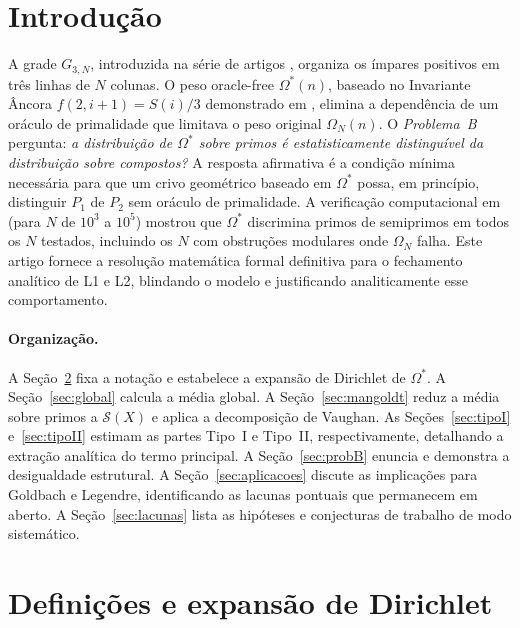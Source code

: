 \documentclass[12pt]{article}
\theoremstyle{definition}
\theoremstyle{remark}
\newcommand{\Omstar}{\Omega^*}
\newcommand{\Sc}{\mathcal{S}}
\begin{document}
	\tableofcontents
	\newpage
	
	\section{Introdução}
	\label{sec:intro}
	
	A grade $G_{3,N}$, introduzida na série de artigos
	\cite{bandeira1,bandeira2,bandeira3}, organiza os ímpares positivos em
	três linhas de $N$ colunas.
	O peso oracle-free $\Omstar(n)$, baseado no
	Invariante Âncora $f(2,i+1)=S(i)/3$ demonstrado em \cite{bandeira2},
	elimina a dependência de um oráculo de primalidade que limitava o peso
	original $\Omega_N(n)$.
	O \emph{Problema~B} pergunta: \emph{a distribuição de $\Omstar$ sobre
		primos é estatisticamente distinguível da distribuição sobre compostos?} 
	A resposta afirmativa é a condição mínima necessária para que um crivo
	geométrico baseado em $\Omstar$ possa, em princípio, distinguir $P_1$
	de $P_2$ sem oráculo de primalidade.
	A verificação computacional em \cite{bandeira3} (para $N$ de $10^3$ a
	$10^5$) mostrou que $\Omstar$ discrimina primos de semiprimos em todos os
	$N$ testados, incluindo os $N$ com obstruções modulares onde $\Omega_N$
	falha.
	Este artigo fornece a resolução matemática formal definitiva para o fechamento analítico de L1 e L2, 
	blindando o modelo e justificando analiticamente esse comportamento.
	
	\paragraph{Organização.}
	A Seção~\ref{sec:defs} fixa a notação e estabelece a expansão de Dirichlet
	de $\Omstar$.
	A Seção~\ref{sec:global} calcula a média global. A
	Seção~\ref{sec:mangoldt} reduz a média sobre primos a $\Sc(X)$ e aplica a
	decomposição de Vaughan.
	As Seções~\ref{sec:tipoI} e~\ref{sec:tipoII} estimam as partes Tipo~I e Tipo~II, 
	respectivamente, detalhando a extração analítica do termo principal. A Seção~\ref{sec:probB} enuncia e demonstra a desigualdade estrutural.
	A Seção~\ref{sec:aplicacoes} discute as implicações para Goldbach e Legendre,
	identificando as lacunas pontuais que permanecem em aberto.
	A Seção~\ref{sec:lacunas} lista as hipóteses e conjecturas de trabalho de
	modo sistemático.
	
	\section{Definições e expansão de Dirichlet}
	\label{sec:defs}
	
\end{document}
